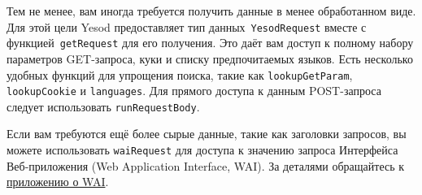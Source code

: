Тем не менее, вам иногда требуется получить данные в менее обработанном виде. Для этой
цели Yesod предоставляет тип данных~\lstinline!YesodRequest!  вместе с
функцией~\lstinline!getRequest! для его получения. Это даёт вам доступ к полному набору
параметров GET-запроса, куки и списку предпочитаемых языков. Есть несколько удобных
функций для упрощения поиска, такие как \lstinline!lookupGetParam!,
\lstinline!lookupCookie! и \lstinline!languages!. Для прямого доступа к данным
POST-запроса следует использовать \lstinline!runRequestBody!.

Если вам требуются ещё более сырые данные, такие как заголовки
запросов, вы можете использовать \lstinline!waiRequest! для доступа к
значению запроса Интерфейса Веб-приложения (Web Application Interface,
WAI). За деталями обращайтесь к \hyperref[chap:web_application_interface]{приложению о WAI}.

